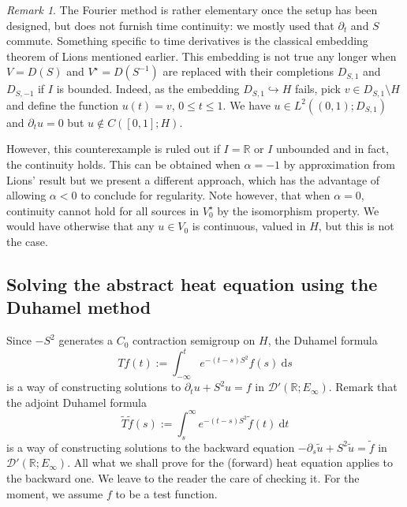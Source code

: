 \documentclass[11pt, letterpaper]{amsart}
\theoremstyle{definition}
\theoremstyle{remark}
\newtheorem{rem}[thm]{Remark}
\numberwithin{equation}{section}
\begin{document}
\begin{rem}
\label{rem:counterexample}The Fourier method is rather elementary once the setup has been designed, but does not furnish time continuity: we mostly used that $\partial_t$ and $S$ commute. Something specific to time derivatives is the classical embedding theorem of Lions \cite{lions1957problemes} mentioned earlier. This embedding is not true any longer when $V=D(S)$ and $V^\star=D(S^{-1})$ are replaced with their completions $D_{S,1}$ and $D_{S,-1}$  if $I$ is bounded. Indeed, as the embedding $D_{S,1} \hookrightarrow H  $ fails,  pick $v \in D_{S,1}\setminus H$ and define the function $u(t)=v$, $0\leq t \leq 1$. We have $u \in L^2((0,1);D_{S,1})$ and $\partial_t u =0$   but $u \notin C([0,1];H)$. 

However, this counterexample is ruled out if $I=\mathbb{R}$ or $I$ unbounded and in fact, the continuity holds.  This can be obtained when $\alpha=-1$ by approximation from Lions' result but we present a different approach, which has the advantage of allowing $\alpha<0$ to conclude for regularity. 
Note however, that when $\alpha=0$, continuity cannot hold for all sources in $V_0^\star$ by the isomorphism property. We would have otherwise that any $u\in V_0$ is continuous, valued in $H$, but this is not the case. 
\end{rem}
    


\subsection{Solving the abstract heat equation using the Duhamel method}

Since $-S^2$ generates a $C_0$ contraction semigroup on $H$, the Duhamel formula
\begin{equation}\label{Duhamel}
    Tf(t):=\int_{-\infty}^{t} e^{-(t-s)S^2}f(s) \ \mathrm{d}s
\end{equation}
is a way of constructing  solutions to $\partial_t u +S^2 u =f$ in $\mathcal{D}'(\mathbb{R}; E_\infty)$. Remark that the adjoint Duhamel formula 
\begin{equation}\label{backwardDuhamel}
    \tilde T\tilde f(s):=\int_{s}^{\infty} e^{-(t-s)S^2}\tilde f(t) \ \mathrm{d}t
\end{equation}
is a way of constructing solutions to the backward equation
$-\partial_s \tilde u +S^2 \tilde u =\tilde f$ in $\mathcal{D}'(\mathbb{R}; E_\infty)$. All what we shall prove for the (forward) heat equation applies to the backward one. We leave to the reader the care of checking it.
For the moment, we assume $f$ to be a test function. 
\end{document}
